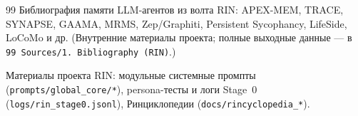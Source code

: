 \begin{thebibliography}{99}
 Библиография памяти LLM-агентов из волта RIN: APEX-MEM, TRACE,
SYNAPSE, GAAMA, MRMS, Zep/Graphiti, Persistent Sycophancy, LifeSide, LoCoMo и др.
(Внутренние материалы проекта; полные выходные данные --- в
\texttt{99 Sources/1.~Bibliography (RIN)}.)

 Материалы проекта RIN: модульные системные промпты
(\texttt{prompts/global\_core/*}), persona-тесты и логи Stage~0
(\texttt{logs/rin\_stage0.jsonl}), Ринциклопедии (\texttt{docs/rincyclopedia\_*}).

\end{thebibliography}
